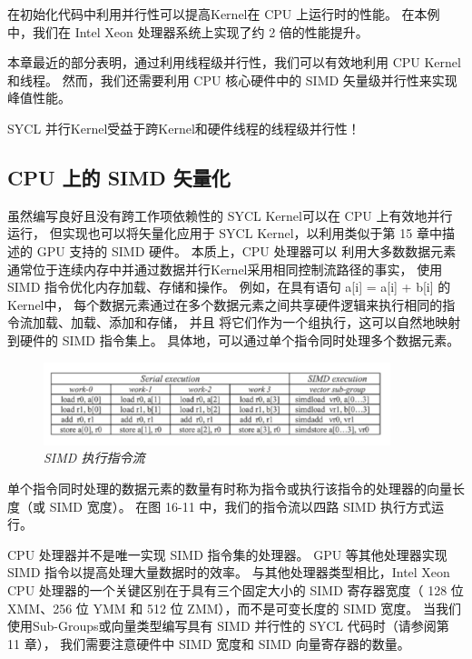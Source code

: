 在初始化代码中利用并行性可以提高Kernel在 CPU 上运行时的性能。 
在本例中，我们在 Intel Xeon 处理器系统上实现了约 2 倍的性能提升。

本章最近的部分表明，通过利用线程级并行性，我们可以有效地利用 CPU Kernel和线程。 
然而，我们还需要利用 CPU 核心硬件中的 SIMD 矢量级并行性来实现峰值性能。

\begin{remark}
	SYCL 并行Kernel受益于跨Kernel和硬件线程的线程级并行性！
\end{remark}

\subsection{CPU 上的 SIMD 矢量化}
虽然编写良好且没有跨工作项依赖性的 SYCL Kernel可以在 CPU 上有效地并行运行，
但实现也可以将矢量化应用于 SYCL Kernel，以利用类似于第 15 章中描述的 GPU 支持的 SIMD 硬件。
本质上，CPU 处理器可以 利用大多数数据元素通常位于连续内存中并通过数据并行Kernel采用相同控制流路径的事实，
使用 SIMD 指令优化内存加载、存储和操作。 
例如，在具有语句 a[i] = a[i] + b[i] 的Kernel中，
每个数据元素通过在多个数据元素之间共享硬件逻辑来执行相同的指令流加载、加载、添加和存储，
并且 将它们作为一个组执行，这可以自然地映射到硬件的 SIMD 指令集上。 
具体地，可以通过单个指令同时处理多个数据元素。

\begin{figure}[H]
	\centering
	\includegraphics[width=0.9\textwidth]{figs/F16.11.png}
	\caption{\textit{SIMD 执行指令流 }}
\end{figure}

单个指令同时处理的数据元素的数量有时称为指令或执行该指令的处理器的向量长度（或 SIMD 宽度）。 
在图 16-11 中，我们的指令流以四路 SIMD 执行方式运行。

CPU 处理器并不是唯一实现 SIMD 指令集的处理器。 GPU 等其他处理器实现 SIMD 指令以提高处理大量数据时的效率。 
与其他处理器类型相比，Intel Xeon CPU 处理器的一个关键区别在于具有三个固定大小的 SIMD 寄存器宽度（
128 位 XMM、256 位 YMM 和 512 位 ZMM），而不是可变长度的 SIMD 宽度。 
当我们使用Sub-Groups或向量类型编写具有 SIMD 并行性的 SYCL 代码时（请参阅第 11 章），
我们需要注意硬件中 SIMD 宽度和 SIMD 向量寄存器的数量。

